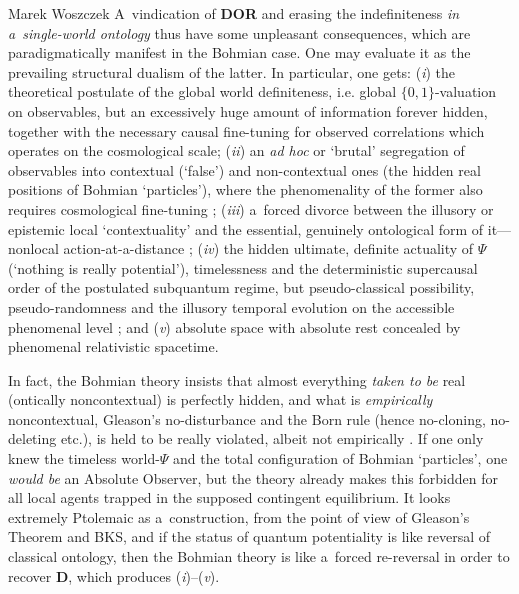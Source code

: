 \begin{artengenv}{Marek Woszczek}
A~vindication of \textbf{DOR} and erasing the indefiniteness \textit{in a~single-world ontology} thus have some unpleasant consequences, which are paradigmatically manifest in the Bohmian case. One may evaluate it as the prevailing structural dualism of the latter. In particular, one gets: (\textit{i}) the theoretical postulate of the global world definiteness, i.e. global $\{0, 1\}$-valuation on observables, but an excessively huge amount of information forever hidden, together with the necessary causal fine-tuning for observed correlations
\parencite[][]{wood_lesson_2015} %
 which operates on the cosmological scale; (\textit{ii}) an \textit{ad hoc} or ‘brutal' segregation of observables into contextual (‘false') and non-contextual ones (the hidden real positions of Bohmian ‘particles'), where the phenomenality of the former also requires cosmological fine-tuning 
\parencite[][]{cavalcanti_classical_2018}; %
 (\textit{iii}) a~forced divorce between the illusory or epistemic local ‘contextuality' and the essential, genuinely ontological form of it---nonlocal action-at-a-distance 
\parencite[][pp.154–156]{durr_quantum_2013}; %
 (\textit{iv}) the hidden ultimate, definite actuality of $\Psi$ (‘nothing is really potential'), timelessness and the deterministic supercausal order of the postulated subquantum regime, but pseudo-classical possibility, pseudo-randomness and the illusory temporal evolution on the accessible phenomenal level 
\parencite[][pp.268–271]{durr_quantum_2013}; %
 and (\textit{v}) absolute space with absolute rest concealed by phenomenal relativistic spacetime.

In fact, the Bohmian theory insists that almost everything \textit{taken to be} real (ontically noncontextual) is perfectly hidden, and what is \textit{empirically} noncontextual, Gleason's no-disturbance and the Born rule (hence no-cloning, no-deleting etc.), is held to be really violated, albeit not empirically
\parencite[e.g.][]{valentini_broglie--bohm_2010}. %
 If one only knew the timeless world-$\Psi$ and the total configuration of Bohmian ‘particles', one \textit{would be} an Absolute Observer, but the theory already makes this forbidden for all local agents trapped in the supposed contingent equilibrium. It looks extremely Ptolemaic as a~construction, from the point of view of Gleason's Theorem and BKS, and if the status of quantum potentiality is like reversal of classical ontology, then the Bohmian theory is like a~forced re-reversal in order to recover \textbf{D}, which produces (\textit{i})–(\textit{v}).


\end{artengenv}
